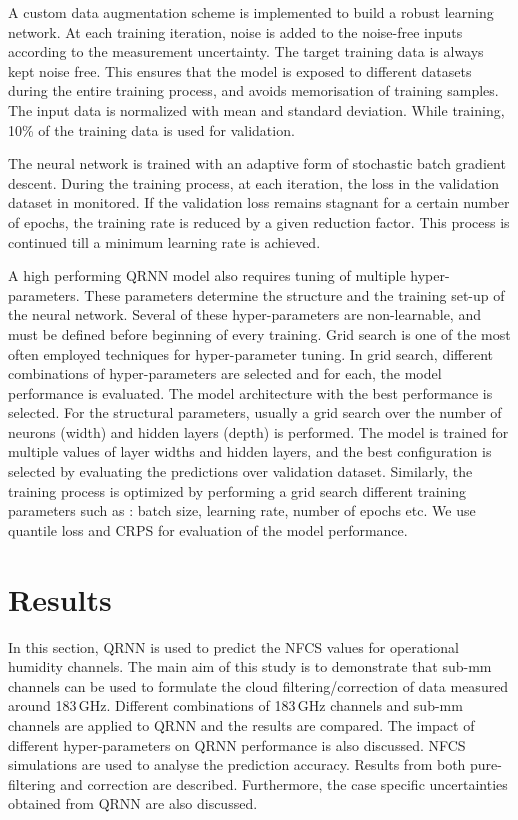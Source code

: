 \documentclass[amt, manuscript]{copernicus}
\begin{document}
A custom data augmentation scheme is implemented to build a robust learning network. At each training iteration, noise is added to the noise-free inputs according to the measurement uncertainty. The target training data is always kept noise free. This ensures that the model is exposed to different datasets during the entire training process, and avoids memorisation of training samples. The input data is normalized with mean and standard deviation. While training, 10\% of the training data is used for validation.
 
The neural network is trained with an adaptive form of stochastic batch gradient descent. During the training process, at each iteration, the loss in the validation dataset in monitored. If the validation loss remains stagnant for a certain number of epochs, the training rate is reduced  by a given reduction factor. This process is continued till a minimum learning rate is achieved.  

A high performing QRNN model also requires tuning of multiple hyper-parameters. These parameters determine the structure and the training set-up of the neural network. Several of these hyper-parameters are non-learnable, and must be defined before beginning of every training. Grid search is one of the most often employed techniques for hyper-parameter tuning. In grid search, different combinations of hyper-parameters are selected and for each, the model performance is evaluated. The model architecture with the best performance is selected. For the structural parameters, usually a grid search over the number of neurons (width) and hidden layers (depth) is performed. The model is trained for multiple values of layer widths and hidden layers, and the best configuration is selected by evaluating the predictions over validation dataset. Similarly, the training process is optimized by performing a grid search different training parameters such as : batch size, learning rate, number of epochs etc. We use quantile loss and CRPS for evaluation of the model performance. 

\section{Results}
%
In this section, QRNN is used to predict the NFCS values for operational humidity channels. The main aim of this study is to demonstrate that sub-mm channels can be used to formulate the cloud filtering/correction of data measured around 183\,GHz. Different combinations of 183\,GHz channels and sub-mm channels are applied to QRNN and the results are compared. The impact of different hyper-parameters on QRNN performance is also discussed. NFCS simulations are used to analyse the prediction accuracy. Results from both pure-filtering and correction are described. Furthermore, the case specific uncertainties obtained from QRNN are also discussed.
 
\end{document}
